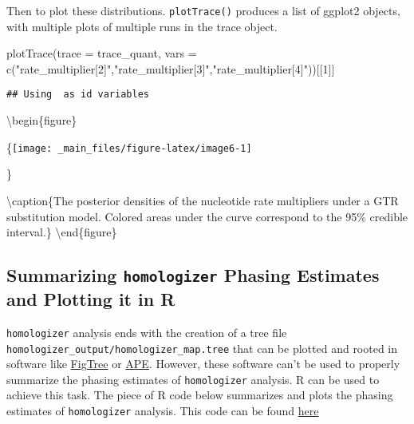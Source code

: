 \documentclass[
]{book}
\newenvironment{Shaded}{\begin{snugshade}}{\end{snugshade}}
\newcommand{\AttributeTok}[1]{\textcolor[rgb]{0.77,0.63,0.00}{#1}}
\newcommand{\DecValTok}[1]{\textcolor[rgb]{0.00,0.00,0.81}{#1}}
\newcommand{\FunctionTok}[1]{\textcolor[rgb]{0.00,0.00,0.00}{#1}}
\newcommand{\NormalTok}[1]{#1}
\newcommand{\StringTok}[1]{\textcolor[rgb]{0.31,0.60,0.02}{#1}}
\begin{document}
Then to plot these distributions. \texttt{plotTrace()} produces a list of ggplot2 objects, with multiple plots of multiple runs in the trace object.

\begin{Shaded}
\begin{Highlighting}[]
\FunctionTok{plotTrace}\NormalTok{(}\AttributeTok{trace =}\NormalTok{ trace\_quant, }\AttributeTok{vars =} \FunctionTok{c}\NormalTok{(}\StringTok{"rate\_multiplier[2]"}\NormalTok{,}\StringTok{"rate\_multiplier[3]"}\NormalTok{,}\StringTok{"rate\_multiplier[4]"}\NormalTok{))[[}\DecValTok{1}\NormalTok{]]}
\end{Highlighting}
\end{Shaded}

\begin{verbatim}
## Using  as id variables
\end{verbatim}

\textbackslash begin\{figure\}

\{\centering \texttt{[image: \_main\_files/figure-latex/image6-1]}

\}

\textbackslash caption\{The posterior densities of the nucleotide rate multipliers under a GTR substitution model. Colored areas under the curve correspond to the 95\% credible interval.\}\label{fig:image6}
\textbackslash end\{figure\}

\hypertarget{summarizing-homologizer-phasing-estimates-and-plotting-it-in-r}{%
\subsection{\texorpdfstring{Summarizing \texttt{homologizer} Phasing Estimates and Plotting it in R}{Summarizing homologizer Phasing Estimates and Plotting it in R}}\label{summarizing-homologizer-phasing-estimates-and-plotting-it-in-r}}

\texttt{homologizer} analysis ends with the creation of a tree file \texttt{homologizer\_output/homologizer\_map.tree} that can be plotted and rooted in software like \href{http://tree.bio.ed.ac.uk/software/figtree/}{FigTree} or \href{https://cran.r-project.org/web/packages/ape/index.html}{APE}. However, these software can't be used to properly summarize the phasing estimates of \texttt{homologizer} analysis. R can be used to achieve this task. The piece of R code below summarizes and plots the phasing estimates of \texttt{homologizer} analysis. This code can be found \href{https://github.com/Chinedum335/Semester_Project/tree/main/5_Code}{here}
\end{document}
